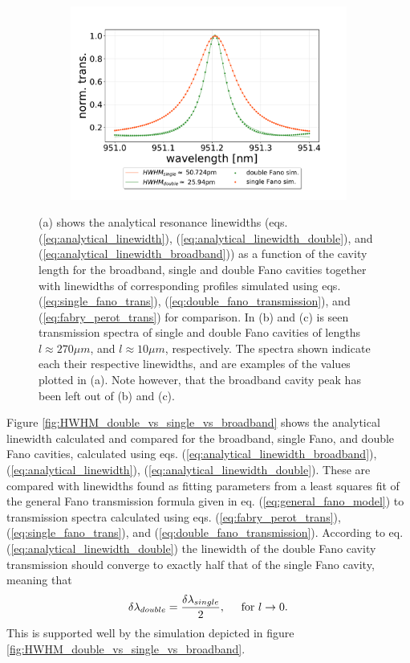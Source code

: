 \begin{figure}[h!]
\begin{subfigure}[c]{0.49\textwidth}
        \includegraphics[width=\textwidth]{figures/sim_single_vs_double_10um.pdf}
        \caption{}
        \label{fig:10um_double_and_single_fano_peak}
    \end{subfigure}
    \caption{(a) shows the analytical resonance linewidths (eqs. (\ref{eq:analytical_linewidth}), (\ref{eq:analytical_linewidth_double}), and (\ref{eq:analytical_linewidth_broadband})) as a function of the cavity length for the broadband, single and double Fano cavities together with linewidths of corresponding profiles simulated using eqs. (\ref{eq:single_fano_trans}), (\ref{eq:double_fano_transmission}), and (\ref{eq:fabry_perot_trans}) for comparison. In (b) and (c) is seen transmission spectra of single and double Fano cavities of lengths $l \approx 270 \mu m$, and $l \approx 10 \mu m$, respectively. The spectra shown indicate each their respective linewidths, and are examples of the values plotted in (a). Note however, that the broadband cavity peak has been left out of (b) and (c).}
\end{figure}

Figure \ref{fig:HWHM_double_vs_single_vs_broadband} shows the analytical linewidth calculated and compared for the broadband, single Fano, and double Fano cavities, calculated using eqs. (\ref{eq:analytical_linewidth_broadband}), (\ref{eq:analytical_linewidth}), (\ref{eq:analytical_linewidth_double}). These are compared with linewidths found as fitting parameters from a least squares fit of the general Fano transmission formula given in eq. (\ref{eq:general_fano_model}) to transmission spectra calculated using eqs. (\ref{eq:fabry_perot_trans}), (\ref{eq:single_fano_trans}), and (\ref{eq:double_fano_transmission}). According to eq. (\ref{eq:analytical_linewidth_double}) the linewidth of the double Fano cavity transmission should converge to exactly half that of the single Fano cavity, meaning that
\begin{equation}
    \delta \lambda_{double} = \frac{\delta \lambda_{single}}{2}, \hspace{0.5cm} \text{for } l \rightarrow 0.
\end{equation}
This is supported well by the simulation depicted in figure \ref{fig:HWHM_double_vs_single_vs_broadband}.

